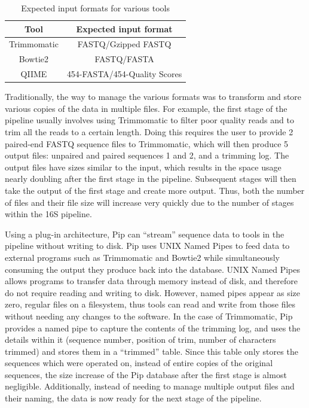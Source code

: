 \documentclass[12pt]{article}
\begin{document}
	\begin{table}
		\centering
		\begin{tabular}{c|c}
		\hline
		Tool & Expected input format\\
		\hline
		Trimmomatic & FASTQ/Gzipped FASTQ\\
		\hline
		Bowtie2 & FASTQ/FASTA\\
		\hline
		QIIME & 454-FASTA/454-Quality Scores\\
		\hline
		\end{tabular}
		\caption{Expected input formats for various tools}
		\label{tab:expected_input}
	\end{table}
	Traditionally, the way to manage the various formats was to transform and store
	various copies of the data in multiple files. For example, the first stage of 
	the pipeline usually involves using Trimmomatic to filter poor quality reads 
	and to trim all the reads to a certain length. Doing this requires the user to
	provide 2 paired-end FASTQ sequence files to Trimmomatic, which will then produce
	5 output files: unpaired and paired sequences 1 and 2, and a trimming log. The 
	output files have sizes similar to the input, which results in the space usage
	nearly doubling after the first stage in the pipeline. Subsequent stages will
	then take the output of the first stage and create more output. Thus, both
	the number of files and their file size will increase very quickly due to the 
	number of stages within the 16S pipeline.
	
	Using a plug-in architecture, Pip can ``stream'' sequence data to tools in the
	pipeline without writing to disk. Pip uses UNIX Named Pipes to feed data to 
	external programs such as Trimmomatic and Bowtie2 while simultaneously consuming 
	the output they produce back into the database. UNIX Named Pipes allows programs to transfer
	data through memory instead of disk, and therefore do not require reading and
	writing to disk. However, named pipes appear as size zero, regular files on a filesystem,
	thus tools can read and write from those files without needing any changes
	to the software. In the case of Trimmomatic, Pip provides a named pipe to capture
	the contents of the trimming log, and uses the details within it (sequence number, 
	position of trim, number of characters trimmed) and stores them in a ``trimmed''
	table. Since this table only stores the sequences which were operated on, instead 
	of entire copies of the original sequences, the size increase of the Pip database
	after the first stage is almost negligible. Additionally, instead of needing to
	manage multiple output files and their naming, the data is now ready for the 
	next stage of the pipeline.
\end{document}
